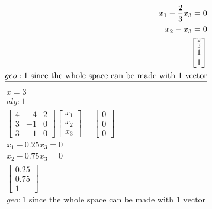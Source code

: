 \documentclass[12pt, a4paper]{article}
\begin{document}
\begin{align*}
				x_1-\frac{2}{3}x_3=0\\
				x_2-x_3=0\\
				\begin{bmatrix}\frac{2}{3}\\1\\1\end{bmatrix}\\
				geo: 1 \text{ since the whole space can be made with 1 vector}\\
				\hline
			\end{align*}
			\begin{align*}
				x=3\\
				alg: 1\\
				\begin{bmatrix}4&-4&2\\3&-1&0\\3&-1&0\end{bmatrix}\begin{bmatrix}x_1\\x_2\\x_3\end{bmatrix}=\begin{bmatrix}0\\0\\0\end{bmatrix}\\
				x_1-0.25x_3=0\\
				x_2-0.75x_3=0\\
				\begin{bmatrix}0.25\\0.75\\1\end{bmatrix}\\
				geo: 1 \text{ since the whole space can be made with 1 vector}				 
			\end{align*}
\end{document}
